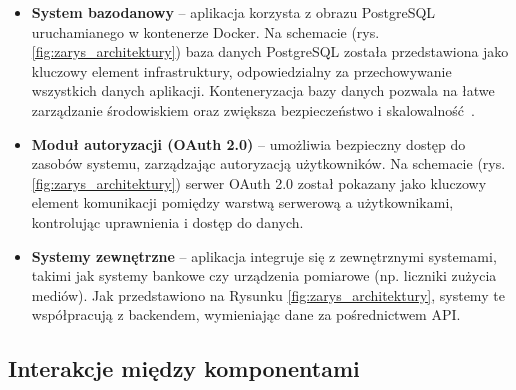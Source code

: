 \begin{itemize}
	\item \textbf{System bazodanowy} – %
	aplikacja korzysta z obrazu PostgreSQL uruchamianego w kontenerze Docker. Na schemacie (rys. \ref{fig:zarys_architektury}) baza danych PostgreSQL została przedstawiona jako kluczowy element infrastruktury, odpowiedzialny za przechowywanie wszystkich danych aplikacji. Konteneryzacja bazy danych pozwala na łatwe zarządzanie środowiskiem oraz zwiększa bezpieczeństwo i skalowalność~\cite{Docker-docs,vsupalov}.

	\item \textbf{Moduł autoryzacji (OAuth 2.0)} – umożliwia bezpieczny dostęp do zasobów systemu, zarządzając autoryzacją użytkowników. Na schemacie (rys. \ref{fig:zarys_architektury}) serwer OAuth 2.0 został pokazany jako kluczowy element komunikacji pomiędzy warstwą serwerową a użytkownikami, kontrolując uprawnienia i dostęp do danych.

	\item \textbf{Systemy zewnętrzne} – aplikacja integruje się z zewnętrznymi systemami, takimi jak systemy bankowe czy urządzenia pomiarowe (np. liczniki zużycia mediów). Jak przedstawiono na Rysunku \ref{fig:zarys_architektury}, systemy te współpracują z backendem, wymieniając dane za pośrednictwem API.

\end{itemize}	

\subsection{Interakcje między komponentami}

